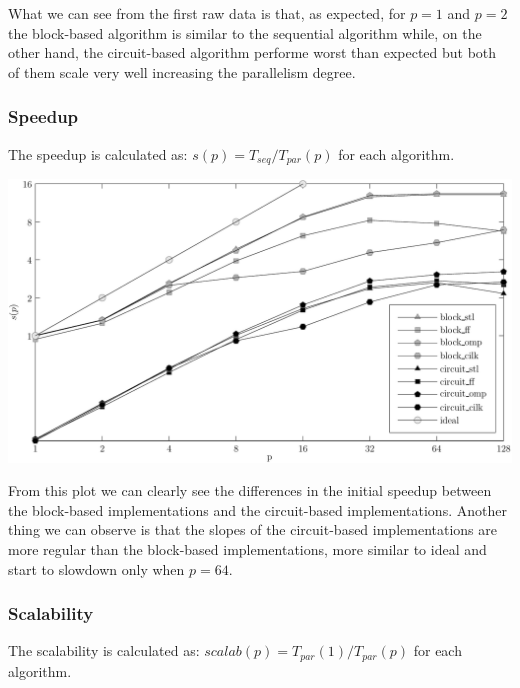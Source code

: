 \documentclass{article}
\begin{document}
\smallskip

What we can see from the first raw data is that, as expected, for $p = 1$ and $p = 2$ the block-based algorithm is similar to the sequential algorithm while, on the other hand, the circuit-based algorithm performe worst than expected but both of them scale very well increasing the parallelism degree.

\subsubsection{Speedup}

The speedup is calculated as: $s(p) = T_{seq} / T_{par}(p)$ for each algorithm.
\begin{center}
\begin{minipage}{0.75\linewidth}
\includegraphics[width=\linewidth]{img/speedup}
\end{minipage}
\end{center}
From this plot we can clearly see the differences in the initial speedup between the block-based implementations and the circuit-based implementations.
Another thing we can observe is that the slopes of the circuit-based implementations are more regular than the block-based implementations, more similar to ideal and start to slowdown only when $p = 64$.

\subsubsection{Scalability}

The scalability is calculated as: $scalab(p) = T_{par}(1) / T_{par}(p)$ for each algorithm.
\end{document}
